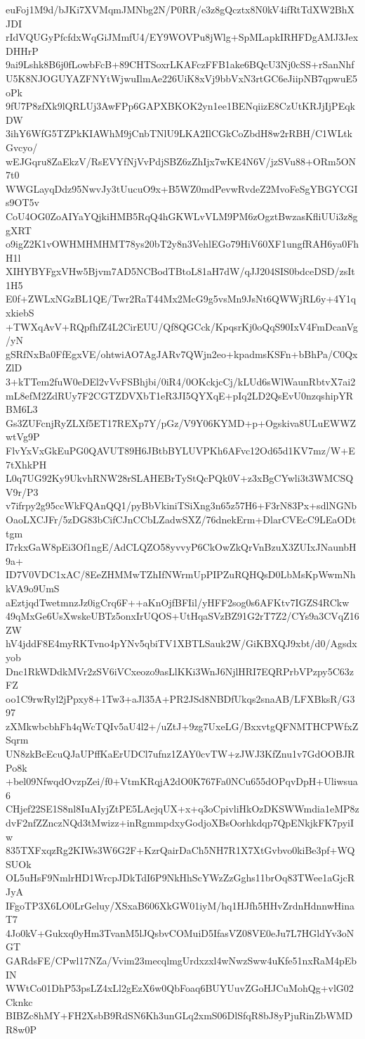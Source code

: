 euFoj1M9d/bJKi7XVMqmJMNbg2N/P0RR/e3z8gQcztx8N0kV4ifRtTdXW2BhXJDI
rIdVQUGyPfcfdxWqGiJMmfU4/EY9WOVPu8jWlg+SpMLapkIRHFDgAMJ3JexDHHrP
9ai9Lshk8B6j0fLowbFcB+89CHTSoxrLKAFczFFB1ake6BQcU3Nj0cSS+rSanNhf
U5K8NJOGUYAZFNYtWjwuIlmAe226UiK8xVj9bbVxN3rtGC6eJiipNB7qpwuE5oPk
9fU7P8zfXk9lQRLUj3AwFPp6GAPXBKOK2yn1ee1BENqiizE8CzUtKRJjIjPEqkDW
3ihY6WfG5TZPkKIAWhM9jCnbTNlU9LKA2IlCGkCoZbdH8w2rRBH/C1WLtkGvcyo/
wEJGqru8ZaEkzV/RsEVYfNjVvPdjSBZ6zZhIjx7wKE4N6V/jzSVu88+ORm5ON7t0
WWGLayqDdz95NwvJy3tUucuO9x+B5WZ0mdPevwRvdeZ2MvoFeSgYBGYCGIs9OT5v
CoU4OG0ZoAIYaYQjkiHMB5RqQ4hGKWLvVLM9PM6zOgztBwzasKfliUUi3z8ggXRT
o9igZ2K1vOWHMHMHMT78ys20bT2y8n3VehlEGo79HiV60XF1ungfRAH6ya0FhH1l
XIHYBYFgxVHw5Bjvm7AD5NCBodTBtoL81aH7dW/qJJ204SIS0bdceDSD/zsIt1H5
E0f+ZWLxNGzBL1QE/Twr2RaT44Mx2McG9g5vsMn9JsNt6QWWjRL6y+4Y1qxkiebS
+TWXqAvV+RQpfhfZ4L2CirEUU/Qf8QGCck/KpqsrKj0oQqS90IxV4FmDcanVg/yN
gSRfNxBa0FfEgxVE/ohtwiAO7AgJARv7QWjn2eo+kpadmsKSFn+bBhPa/C0QxZlD
3+kTTem2fuW0eDEl2vVvFSBhjbi/0iR4/0OKckjcCj/kLUd6sWlWaunRbtvX7ai2
mL8efM2ZdRUy7F2CGTZDVXbT1eR3JI5QYXqE+pIq2LD2QsEvU0nzqshipYRBM6L3
Gs3ZUFcnjRyZLXf5ET17REXp7Y/pGz/V9Y06KYMD+p+Ogskiva8ULuEWWZwtVg9P
FlvYxVxGkEuPG0QAVUT89H6JBtbBYLUVPKh6AFvc12Od65d1KV7mz/W+E7tXhkPH
L0q7UG92Ky9UkvhRNW28rSLAHEBrTyStQcPQk0V+z3xBgCYwli3t3WMCSQV9r/P3
v7ifrpy2g95ccWkFQAnQQ1/pyBbVkiniTSiXng3n65z57H6+F3rN83Px+sdlNGNb
OaoLXCJFr/5zDG83bCifCJnCCbLZadwSXZ/76dnekErm+DlarCVEcC9LEaODttgm
I7rkxGaW8pEi3Of1ngE/AdCLQZO58yvvyP6CkOwZkQrVnBzuX3ZUIxJNaunbH9a+
ID7V0VDC1xAC/8EeZHMMwTZhIfNWrmUpPIPZuRQHQsD0LbMsKpWwmNhkVA9o9UmS
aEztjqdTwetmnzJz0igCrq6F++aKnOjfBFIil/yHFF2sog0s6AFKtv7IGZS4RCkw
49qMxGe6UsXwskeUBTz5onxIrUQOS+UtHqaSVzBZ91G2rT7Z2/CYs9a3CVqZ16ZW
hV4jddF8E4myRKTvno4pYNv5qbiTV1XBTLSauk2W/GiKBXQJ9xbt/d0/Agsdxyob
Dnc1RkWDdkMVr2zSV6iVCxeozo9asLlKKi3WnJ6NjlHRI7EQRPrbVPzpy5C63zFZ
oo1C9rwRyl2jPpxy8+1Tw3+aJl35A+PR2JSd8NBDfUkqs2snaAB/LFXBksR/G397
zXMkwbcbhFh4qWcTQIv5aU4l2+/uZtJ+9zg7UxeLG/BxxvtgQFNMTHCPWfxZSqrm
UN8zkBcEcuQJaUPffKaErUDCl7ufnz1ZAY0cvTW+zJWJ3KfZnu1v7GdOOBJRPo8k
+bel09NfwqdOvzpZei/f0+VtmKRqjA2dO0K767Fa0NCu655dOPqvDpH+Uliwsua6
CHjef22SE1S8nl8IuAIyjZtPE5LAejqUX+x+q3oCpivliHkOzDKSWWmdia1eMP8z
dvF2nfZZnczNQd3tMwizz+inRgmmpdxyGodjoXBsOorhkdqp7QpENkjkFK7pyiIw
835TXFxqzRg2KIWs3W6G2F+KzrQairDaCh5NH7R1X7XtGvbvo0kiBe3pf+WQSUOk
OL5uHsF9NmlrHD1WrcpJDkTdI6P9NkHhScYWzZzGghs11brOq83TWee1aGjcRJyA
IFgoTP3X6LO0LrGeluy/XSxaB606XkGW01iyM/hq1HJfh5HHvZrdnHdnnwHinaT7
4Jo0kV+Gukxq0yHm3TvanM5lJQsbvCOMuiD5IfasVZ08VE0eJu7L7HGldYv3oNGT
GARdsFE/CPwl17NZa/Vvim23mecqlmgUrdxzxl4wNwzSww4uKfe51nxRaM4pEbIN
WWtCo01DhP53psLZ4xLl2gEzX6w0QbFoaq6BUYUuvZGoHJCuMohQg+vlG02Cknkc
BIBZc8hMY+FH2XsbB9RdSN6Kh3unGLq2xmS06DlSfqR8bJ8yPjuRinZbWMDR8w0P
